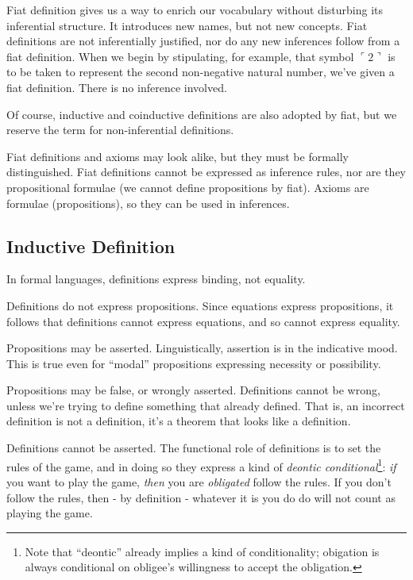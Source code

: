 \documentclass{article}
\begin{document}
Fiat definition gives us a way to enrich our vocabulary without
disturbing its inferential structure. It introduces new names, but not
new concepts. Fiat definitions are not inferentially justified, nor do
any new inferences follow from a fiat definition. When we begin by
stipulating, for example, that symbol \(\ulcorner 2\urcorner\) is to
be taken to represent the second non-negative natural number, we've
given a fiat definition. There is no inference involved.

Of course, inductive and coinductive definitions are also adopted by
fiat, but we reserve the term for non-inferential definitions.

Fiat definitions and axioms may look alike, but they must be formally
distinguished. Fiat definitions cannot be expressed as inference
rules, nor are they propositional formulae (we cannot define
propositions by fiat). Axioms are formulae (propositions), so they can
be used in inferences.

\subsection{Inductive Definition}

In formal languages, definitions express binding, not equality.

Definitions do not express propositions. Since equations express
propositions, it follows that definitions cannot express equations,
and so cannot express equality.

Propositions may be asserted. Linguistically, assertion is in the
indicative mood. This is true even for ``modal'' propositions
expressing necessity or possibility.

Propositions may be false, or wrongly asserted. Definitions cannot be
wrong, unless we're trying to define something that already defined.
That is, an incorrect definition is not a definition, it's a theorem
that looks like a definition.

Definitions cannot be asserted. The functional role of definitions is
to set the rules of the game, and in doing so they express a kind of
\textit{deontic conditional}\footnote{Note that ``deontic'' already
implies a kind of conditionality; obigation is always conditional on
obligee's willingness to accept the obligation.}: \textit{if} you want
to play the game, \textit{then} you are \textit{obligated} follow the
rules. If you don't follow the rules, then - by definition - whatever
it is you do do will not count as playing the game.
\end{document}
